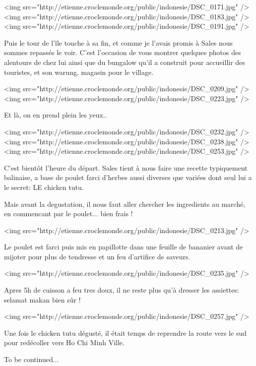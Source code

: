 <img src="http://etienne.croclemonde.org/public/indonesie/DSC_0171.jpg" />
<img src="http://etienne.croclemonde.org/public/indonesie/DSC_0183.jpg" />
<img src="http://etienne.croclemonde.org/public/indonesie/DSC_0191.jpg" />

Puis le tour de l'île touche à sa fin, et comme je l'avais promis à Sales nous sommes repassés le voir. C'est l'occasion de vous montrer quelques photos des alentours de chez lui ainsi que du bungalow qu'il a construit pour accueillir des touristes, et son warung, magasin pour le village.

<img src="http://etienne.croclemonde.org/public/indonesie/DSC_0209.jpg" />
<img src="http://etienne.croclemonde.org/public/indonesie/DSC_0223.jpg" />

Et là, on en prend plein les yeux..

<img src="http://etienne.croclemonde.org/public/indonesie/DSC_0232.jpg" />
<img src="http://etienne.croclemonde.org/public/indonesie/DSC_0238.jpg" />
<img src="http://etienne.croclemonde.org/public/indonesie/DSC_0253.jpg" />

C'est bientôt l'heure du départ. Sales tient à nous faire une recette typiquement balinaise, a base de poulet farci d'herbes aussi diverses que variées dont seul lui a le secret: LE chicken tutu.

Mais avant la degustation, il nous faut aller chercher les ingredients au marché, en commencant par le poulet... bien frais !

<img src="http://etienne.croclemonde.org/public/indonesie/DSC_0213.jpg" />

Le poulet est farci puis mis en papillotte dans une feuille de bananier avant de mijoter pour plus de tendresse et un feu d'artifice de saveurs.

<img src="http://etienne.croclemonde.org/public/indonesie/DSC_0235.jpg" />

Apres 5h de cuisson a feu tres doux, il ne reste plus qu'à dresser les assiettes: selamat makan bien sûr !

<img src="http://etienne.croclemonde.org/public/indonesie/DSC_0257.jpg" />

Une fois le chicken tutu dégusté, il était temps de reprendre la route vers le sud pour redécoller vers Ho Chi Minh Ville.

To be continued...
